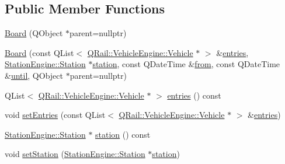 \subsection*{Public Member Functions}
\begin{DoxyCompactItemize}
\item 
\mbox{\hyperlink{classQRail_1_1LiveboardEngine_1_1Board_a9551cfa04103fadcd7d3ed9771bab947}{Board}} (Q\+Object $\ast$parent=nullptr)
\item 
\mbox{\hyperlink{classQRail_1_1LiveboardEngine_1_1Board_a4be1ea3d4ce8b195242b1de059884caa}{Board}} (const Q\+List$<$ \mbox{\hyperlink{classQRail_1_1VehicleEngine_1_1Vehicle}{Q\+Rail\+::\+Vehicle\+Engine\+::\+Vehicle}} $\ast$ $>$ \&\mbox{\hyperlink{classQRail_1_1LiveboardEngine_1_1Board_afbba31f8d0f67e98f9bea58ebcf1e9ac}{entries}}, \mbox{\hyperlink{classQRail_1_1StationEngine_1_1Station}{Station\+Engine\+::\+Station}} $\ast$\mbox{\hyperlink{classQRail_1_1LiveboardEngine_1_1Board_a96964c52def29a72003eb27701cafe12}{station}}, const Q\+Date\+Time \&\mbox{\hyperlink{classQRail_1_1LiveboardEngine_1_1Board_a503aaa8cea63f129e08581a49e308479}{from}}, const Q\+Date\+Time \&\mbox{\hyperlink{classQRail_1_1LiveboardEngine_1_1Board_af09d8cddaaf92ba4a3a5d74ee393388b}{until}}, Q\+Object $\ast$parent=nullptr)
\item 
Q\+List$<$ \mbox{\hyperlink{classQRail_1_1VehicleEngine_1_1Vehicle}{Q\+Rail\+::\+Vehicle\+Engine\+::\+Vehicle}} $\ast$ $>$ \mbox{\hyperlink{classQRail_1_1LiveboardEngine_1_1Board_afbba31f8d0f67e98f9bea58ebcf1e9ac}{entries}} () const
\item 
void \mbox{\hyperlink{classQRail_1_1LiveboardEngine_1_1Board_a48325ac92e049047391823d2ea55c0d7}{set\+Entries}} (const Q\+List$<$ \mbox{\hyperlink{classQRail_1_1VehicleEngine_1_1Vehicle}{Q\+Rail\+::\+Vehicle\+Engine\+::\+Vehicle}} $\ast$ $>$ \&\mbox{\hyperlink{classQRail_1_1LiveboardEngine_1_1Board_afbba31f8d0f67e98f9bea58ebcf1e9ac}{entries}})
\item 
\mbox{\hyperlink{classQRail_1_1StationEngine_1_1Station}{Station\+Engine\+::\+Station}} $\ast$ \mbox{\hyperlink{classQRail_1_1LiveboardEngine_1_1Board_a96964c52def29a72003eb27701cafe12}{station}} () const
\item 
void \mbox{\hyperlink{classQRail_1_1LiveboardEngine_1_1Board_ad54690cca1439296875c9c7c83234bd8}{set\+Station}} (\mbox{\hyperlink{classQRail_1_1StationEngine_1_1Station}{Station\+Engine\+::\+Station}} $\ast$\mbox{\hyperlink{classQRail_1_1LiveboardEngine_1_1Board_a96964c52def29a72003eb27701cafe12}{station}})
\item 

\end{DoxyCompactItemize}
